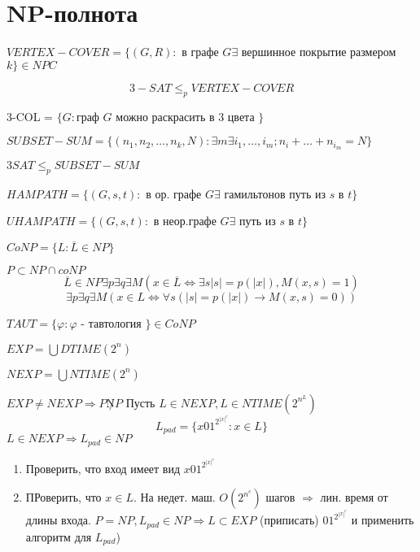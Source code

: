 	\section{NP-полнота}	
	
	\begin{definition}
			$VERTEX-COVER=\{(G,R):$ в графе $G \exists$ вершинное покрытие размером $k\} \in NPC$	
	\end{definition}
	$$3-SAT \le_p VERTEX-COVER$$
	
	\begin{definition}
		3-COL = $\{G :$граф $G$  можно раскрасить в 3 цвета $\}$
	\end{definition}
	
	\begin{definition}
		$SUBSET-SUM = \{(n_1,n_2,\ldots,n_k, N): \exists m \exists i_1, \ldots, i_m ; n_i + \ldots + n_{i_m} = N \}$
	\end{definition}
	$3SAT \le_p SUBSET-SUM$
	
	\begin{definition}
		$HAMPATH = \{(G,s,t) :$ в ор. графе $G \exists$ гамильтонов путь из $s$ в $t \}$ 
	\end{definition}
	$UHAMPATH = \{(G,s,t) : $ в неор.графе $G \exists$  путь из $s$ в  $t \}$
	
	\begin{definition}
		$CoNP = \{L: \overline L \in NP \}$
	\end{definition}
	$P \subset NP \cap coNP$
	$$\overline L \in NP \exists p \exists q \exists M (x \in \overline L \Leftrightarrow \exists s |s| = p(|x|), M(x,s) = 1)$$
	$$\exists p \exists q \exists M (x \in L \Leftrightarrow \forall s (|s| = p(|x|) \to M(x,s) = 0))$$
	
	\begin{definition}
		$TAUT = \{\varphi : \varphi$ - тавтология $\} \in CoNP$
	\end{definition}
	
	\begin{definition}
		$EXP = \bigcup DTIME (2^n)$
	\end{definition}
	
	\begin{definition}
		$NEXP = \bigcup NTIME(2^n)$
	\end{definition}
	
	\begin{theorem}
		$EXP \not = NEXP \Rightarrow P \not NP$
		\proof
		Пусть $L \in NEXP, L \in NTIME (2^{n^L})$
		$$L_{pad} = \{x01^{2^{|x|^c}} : x \in L \}$$
		$L \in NEXP \Rightarrow L_{pad} \in NP$
		
		\begin{enumerate}
			\item Проверить, что вход имеет вид $x01^{2^{|x|^c}}$
			\item ПРоверить, что $x \in L$. На недет. маш. $O(2^{n^c})$ шагов $\Rightarrow$ лин. время от длины входа.
			$ P = NP, L_{pad} \in NP \Rightarrow L \subset EXP$ (приписать) $01^{2^{|x|^c}}$ и применить алгоритм для $L_{pad}$)
		\end{enumerate}
	\end{theorem}
	
